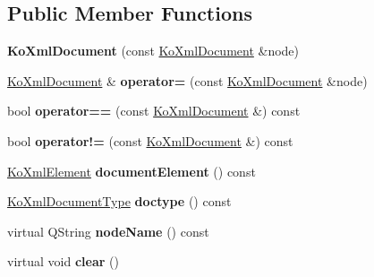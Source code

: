 \subsection*{Public Member Functions}
\begin{DoxyCompactItemize}
\item 
\hypertarget{classKoXmlDocument_a25098f08f373e4b0ac8115279eb65c8b}{
{\bfseries KoXmlDocument} (const \hyperlink{classKoXmlDocument}{KoXmlDocument} \&node)}
\label{classKoXmlDocument_a25098f08f373e4b0ac8115279eb65c8b}

\item 
\hypertarget{classKoXmlDocument_aae3cf314dc2212a6930689a565e9b674}{
\hyperlink{classKoXmlDocument}{KoXmlDocument} \& {\bfseries operator=} (const \hyperlink{classKoXmlDocument}{KoXmlDocument} \&node)}
\label{classKoXmlDocument_aae3cf314dc2212a6930689a565e9b674}

\item 
\hypertarget{classKoXmlDocument_a94a468069c36d6bb136fe5aa0cf850f1}{
bool {\bfseries operator==} (const \hyperlink{classKoXmlDocument}{KoXmlDocument} \&) const }
\label{classKoXmlDocument_a94a468069c36d6bb136fe5aa0cf850f1}

\item 
\hypertarget{classKoXmlDocument_a4f791e9965cdf7098c7aa50e40b0bb43}{
bool {\bfseries operator!=} (const \hyperlink{classKoXmlDocument}{KoXmlDocument} \&) const }
\label{classKoXmlDocument_a4f791e9965cdf7098c7aa50e40b0bb43}

\item 
\hypertarget{classKoXmlDocument_a1f15d923c78de93d044de05097f9bdcb}{
\hyperlink{classKoXmlElement}{KoXmlElement} {\bfseries documentElement} () const }
\label{classKoXmlDocument_a1f15d923c78de93d044de05097f9bdcb}

\item 
\hypertarget{classKoXmlDocument_a6266b024d223083496a47251012787c2}{
\hyperlink{classKoXmlDocumentType}{KoXmlDocumentType} {\bfseries doctype} () const }
\label{classKoXmlDocument_a6266b024d223083496a47251012787c2}

\item 
\hypertarget{classKoXmlDocument_a8e6196e9bfc792164d8c481bb7f11fcd}{
virtual QString {\bfseries nodeName} () const }
\label{classKoXmlDocument_a8e6196e9bfc792164d8c481bb7f11fcd}

\item 
\hypertarget{classKoXmlDocument_a5291c35721c45c0109176d9db6162fee}{
virtual void {\bfseries clear} ()}
\label{classKoXmlDocument_a5291c35721c45c0109176d9db6162fee}


\end{DoxyCompactItemize}
